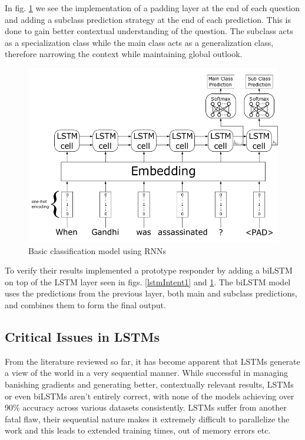 \documentclass[a4paper,12pt]{report}
\begin{document}
		In fig. \ref{lstmIntent2} we see the implementation of a padding layer at the end of each question and adding a subclass prediction strategy at the end of each prediction. This is done to gain better contextual understanding of the question. The subclass acts as a specialization class while the main class acts as a generalization class, therefore narrowing the context while maintaining global outlook.
		\begin{figure}[!h]
			\centering
			\includegraphics[scale=0.35]{../images/lstm-intent2.png}
			\caption{Basic classification model using RNNs \citep{lstmintent}}\label{lstmIntent2}
		\end{figure}
		To verify their results \citep{lstmintent} implemented a prototype responder by adding a biLSTM on top of the LSTM layer seen in figs. \ref{lstmIntent1} and \ref{lstmIntent2}.  The biLSTM model uses the predictions from the previous layer, both main and subclass predictions, and combines them to form the final output.

		\subsection{Critical Issues in LSTMs}\label{c2criticalissues}

		From the literature reviewed so far, it has become apparent that LSTMs generate a view of the world in a very sequential manner. While successful in managing banishing gradients and generating better, contextually relevant results, LSTMs or even biLSTMs aren't entirely correct, with none of the models achieving over 90\% accuracy across various datasets consistently. LSTMs suffer from another fatal flaw, their sequential nature makes it extremely difficult to parallelize the work and this leads to extended training times, out of memory errors etc.
\end{document}
